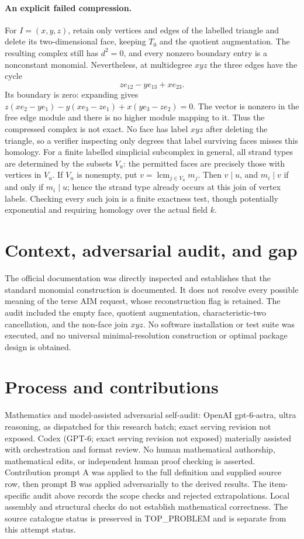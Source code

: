 \documentclass[11pt]{article}
\begin{document}
\paragraph{An explicit failed compression.}
For $I=(x,y,z)$, retain only vertices and edges of the labelled triangle and
delete its two-dimensional face, keeping $T_0$ and the quotient augmentation.
The resulting complex still has $d^2=0$, and every nonzero boundary entry is
a nonconstant monomial. Nevertheless, at multidegree $xyz$ the three edges
have the cycle
\[
z e_{12}-y e_{13}+x e_{23}.
\]
Its boundary is zero: expanding gives
$z(x e_2-y e_1)-y(x e_3-z e_1)+x(y e_3-z e_2)=0$.
The vector is nonzero in the free edge module and there is no higher module
mapping to it. Thus the compressed complex is not exact. No face has label
$xyz$ after deleting the triangle, so a verifier inspecting only degrees
that label surviving faces misses this homology.
For a finite labelled simplicial subcomplex in general, all strand types
are determined by the subsets $V_u$: the permitted faces are precisely those
with vertices in $V_u$. If $V_u$ is nonempty, put $v=\operatorname{lcm}_{j\in V_u}m_j$.
Then $v\mid u$, and $m_i\mid v$ if and only if $m_i\mid u$; hence the
strand type already occurs at this join of vertex labels. Checking every
such join is a finite exactness test, though potentially exponential and
requiring homology over the actual field $k$.

\section{Context, adversarial audit, and gap}
The official documentation was directly inspected and establishes that the
standard monomial construction is documented. It does not resolve every
possible meaning of the terse AIM request, whose reconstruction flag is
retained. The audit included the empty face, quotient augmentation,
characteristic-two cancellation, and the non-face join $xyz$. No software
installation or test suite was executed, and no universal minimal-resolution
construction or optimal package design is obtained.

\section{Process and contributions}
Mathematics and model-assisted adversarial self-audit: OpenAI gpt-6-astra, ultra reasoning, as dispatched for this research batch; exact serving revision not exposed. Codex (GPT-6; exact serving revision not exposed) materially assisted with orchestration and format review. No human mathematical authorship, mathematical edits, or independent human proof checking is asserted.
Contribution prompt A was applied to the full definition and supplied source row, then prompt B was applied adversarially to the derived results. The item-specific audit above records the scope checks and rejected extrapolations. Local assembly and structural checks do not establish mathematical correctness. The source catalogue status is preserved in TOP\_PROBLEM and is separate from this attempt status.
\end{document}
